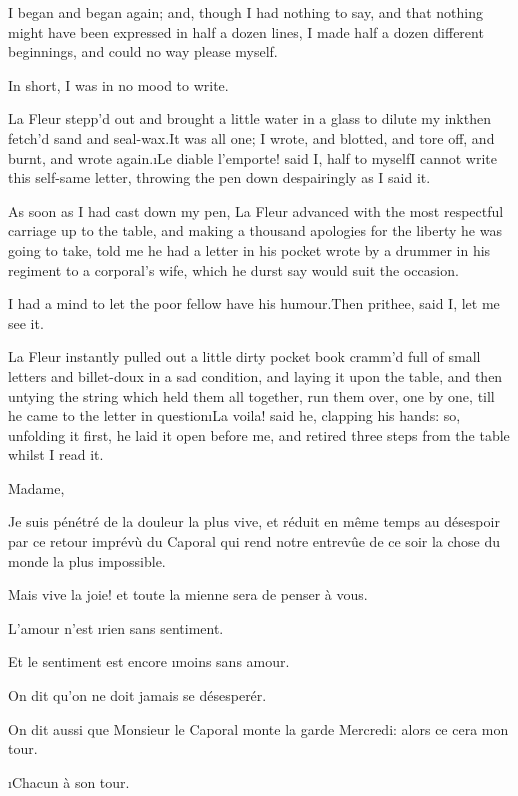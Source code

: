 \documentclass[twoside]{article}
\begin{document}
I began and began again; and, though I had nothing to say, and that
nothing might have been expressed in half a dozen lines, I made half a
dozen different beginnings, and could no way please myself.

In short, I was in no mood to write.

La Fleur stepp’d out and brought a little water in a glass to dilute my
ink\tsk then fetch’d sand and seal-wax.\tsk It was all one; I wrote, and
blotted, and tore off, and burnt, and wrote again.\tsk \i{Le diable l’emporte}!
said I, half to myself\tsk I cannot write this self-same letter, throwing
the pen down despairingly as I said it.

As soon as I had cast down my pen, La Fleur advanced with the most
respectful carriage up to the table, and making a thousand apologies for
the liberty he was going to take, told me he had a letter in his pocket
wrote by a drummer in his regiment to a corporal’s wife, which he durst
say would suit the occasion.

I had a mind to let the poor fellow have his humour.\tsk Then prithee, said
I, let me see it.

La Fleur instantly pulled out a little dirty pocket book cramm’d full of
small letters and billet-doux in a sad condition, and laying it upon the
table, and then untying the string which held them all together, run them
over, one by one, till he came to the letter in question\tsk \i{La voila}!
said he, clapping his hands: so, unfolding it first, he laid it open
before me, and retired three steps from the table whilst I read it.






Madame,

Je suis pénétré de la douleur la plus vive, et réduit en même temps au
désespoir par ce retour imprévù du Caporal qui rend notre entrevûe de ce
soir la chose du monde la plus impossible.

Mais vive la joie! et toute la mienne sera de penser à vous.

L’amour n’est \i{rien} sans sentiment.

Et le sentiment est encore \i{moins} sans amour.

On dit qu’on ne doit jamais se désesperér.

On dit aussi que Monsieur le Caporal monte la garde Mercredi: alors ce
cera mon tour.

                           \i{Chacun à son tour}.
\end{document}
